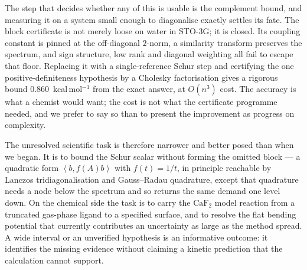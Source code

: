 \documentclass[11pt,a4paper]{article}
\theoremstyle{plain}
\theoremstyle{definition}
\theoremstyle{remark}
\newcommand{\ip}[2]{\left\langle #1,#2\right\rangle}
\begin{document}
The step that decides whether any of this is usable is the complement bound, and
measuring it on a system small enough to diagonalise exactly settles its fate. The
block certificate is not merely loose on water in STO-3G; it is closed. Its
coupling constant is pinned at the off-diagonal $2$-norm, a similarity transform
preserves the spectrum, and sign structure, low rank and diagonal weighting all
fail to escape that floor. Replacing it with a single-reference Schur step and
certifying the one positive-definiteness hypothesis by a Cholesky factorisation
gives a rigorous bound $0.860$~kcal\,mol$^{-1}$ from the exact answer, at $O(n^3)$
cost. The accuracy is what a chemist would want; the cost is not what the
certificate programme needed, and we prefer to say so than to present the
improvement as progress on complexity.

The unresolved scientific task is therefore narrower and better posed than when we
began. It is to bound the Schur scalar without forming the omitted block --- a
quadratic form $\ip{b}{f(A)b}$ with $f(t)=1/t$, in principle reachable by Lanczos
tridiagonalisation and Gauss--Radau quadrature, except that quadrature needs a node
below the spectrum and so returns the same demand one level down. On the chemical
side the task is to carry the $\mathrm{CaF_2}$ model reaction from a truncated
gas-phase ligand to a specified surface, and to resolve the flat bending potential
that currently contributes an uncertainty as large as the method spread. A wide
interval or an unverified hypothesis is an informative outcome: it identifies the
missing evidence without claiming a kinetic prediction that the calculation cannot
support.
\end{document}
